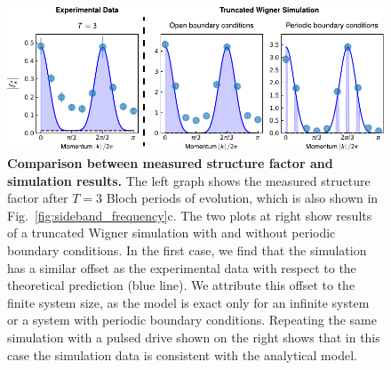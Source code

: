 \documentclass[aps,pra,twocolumn,superscriptaddress]{revtex4-1} %
\begin{document}
\newpage
\begin{figure}[h]
    \centering
    \includegraphics{Figures/ExtData3.pdf}
    \caption{\textbf{Comparison between measured structure factor and simulation results.} The left graph shows the measured structure factor after $T=3$ Bloch periods of evolution, which is also shown in Fig.~\ref{fig:sideband_frequency}c. The two plots at right show results of a truncated Wigner simulation with and without periodic boundary conditions. In the first case, we find that the simulation has a similar offset as the experimental data with respect to the theoretical prediction (blue line). We attribute this offset to the finite system size, as the model is exact only for an infinite system or a system with periodic boundary conditions. Repeating the same simulation with a pulsed drive shown on the right shows that in this case the simulation data is consistent with the analytical model.}
    \label{ExtFig:Comp_Sim_Data}
\end{figure}
\clearpage
{}


\end{document}
